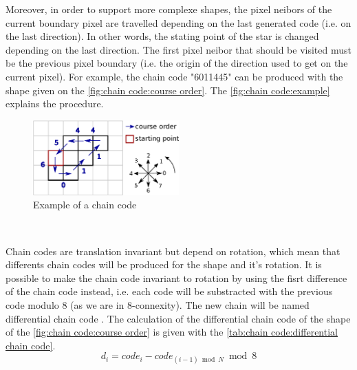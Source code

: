 Moreover, in order to support more complexe shapes, the pixel neibors of the current boundary pixel are travelled depending on the last generated code (i.e. on the last direction). In other words, the stating point of the star is changed depending on the last direction. The first pixel neibor that should be visited must be the previous pixel boundary (i.e. the origin of the direction used to get on the current pixel). For example, the chain code "6011445" can be produced with the shape given on the \vref{fig:chain code:course order}. The \vref{fig:chain code:example} explains the procedure. 

\begin{figure}[H]
	\centering
	\includegraphics[width=0.5\textwidth]{images/chain_code/example}
	\caption{Example of a chain code}
	\label{fig:chain code:example}	
\end{figure}

~~

Chain codes are translation invariant but depend on rotation, which mean that differents chain codes will be produced for the shape and it's rotation. It is possible to make the chain code invariant to rotation by using the fisrt difference of the chain code instead, i.e. each code will be substracted with the previous code modulo 8 (as we are in 8-connexity). The new chain will be named differential chain code \cite{bib:chain:RepresentationAndDescription}. The calculation of the differential chain code of the shape of the \vref{fig:chain code:course order} is given with the \vref{tab:chain code:differential chain code}.
\begin{equation} \label{eq:chain code:differential chain code}
d_i = code_i - code_{(i-1) \bmod N} \bmod 8
\end{equation}


